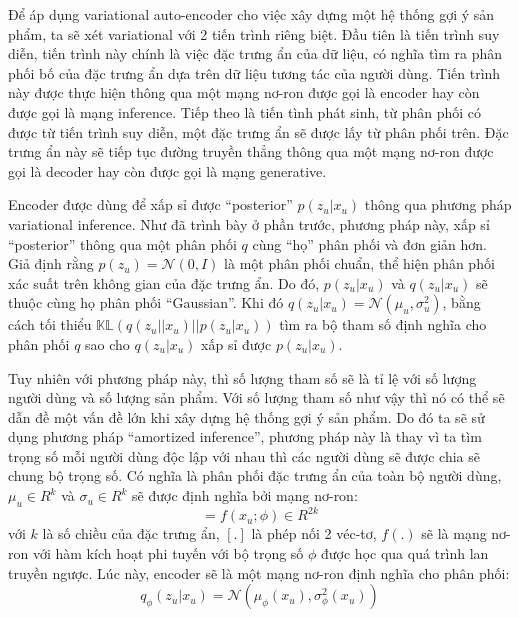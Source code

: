     
    Để áp dụng variational auto-encoder cho việc xây dựng một hệ thống gợi ý sản phẩm, ta sẽ xét variational với 2 tiến trình riêng biệt. 
    Đầu tiên là tiến trình suy diễn, tiến trình này chính là việc đặc trưng ẩn của dữ liệu, có nghĩa tìm ra phân phối bố của đặc trưng ẩn dựa trên dữ liệu tương tác của người dùng. 
    Tiến trình này được thực hiện thông qua một mạng nơ-ron được gọi là encoder hay còn được gọi là mạng inference.
    Tiếp theo là tiến tình phát sinh, từ phân phối có được từ tiến trình suy diễn, một đặc trưng ẩn sẽ được lấy từ phân phối trên. 
    Đặc trưng ẩn này sẽ tiếp tục đường truyền thẳng thông qua một mạng nơ-ron được gọi là decoder hay còn được gọi là mạng generative.



    Encoder được dùng để xấp sỉ được ``posterior'' $p(z_u|x_u)$ thông qua phương pháp variational inference. 
    Như đã trình bày ở phần trước, phương pháp này, xấp sỉ ``posterior'' thông qua một phân phối $q$ cùng ``họ'' phân phối và đơn giản hơn.
    Giả định rằng $p(z_u) = \mathcal{N}(0,I)$ là một phân phối chuẩn, thể hiện phân phối xác suất trên không gian của đặc trưng ẩn.
    Do đó, $p(z_u|x_u)$ và $q(z_u|x_u)$ sẽ thuộc cùng họ phân phối ``Gaussian''. 
    Khi đó $q(z_u|x_u) = \mathcal{N}(\mu_u,\sigma_u^2)$, bằng cách tối thiểu $\mathbb{KL}(q(z_u||x_u) || p(z_u|x_u))$ tìm ra bộ tham số định nghĩa cho phân phối $q$ sao cho $q(z_u | x_u)$ xấp sỉ được $p(z_u|x_u)$.    

    Tuy nhiên với phương pháp này, thì số lượng tham số sẽ là tỉ lệ với số lượng người dùng và số lượng sản phẩm.
    Với số lượng tham số như vậy thì nó có thể sẽ dẫn đề một vấn đề lớn khi xây dựng hệ thống gợi ý sản phẩm.
    Do đó ta sẽ sử dụng phương pháp ``amortized inference'', phương pháp này là thay vì ta tìm trọng số mỗi người dùng độc lập với nhau thì các người dùng sẽ được chia sẽ chung bộ trọng số.
    Có nghĩa là phân phối đặc trưng ẩn của toàn bộ người dùng, $\mu_u \in R^k $ và $\sigma_u \in R^k $ sẽ được định nghĩa bởi mạng nơ-ron:
    \begin{equation}
        [\mu_u,\sigma_u] = f(x_u;\phi) \in R^{2k}
    \end{equation}
    với $k$ là số chiều của đặc trưng ẩn, $[.]$ là phép nối 2 véc-tơ, $f(.)$ sẽ là mạng nơ-ron với hàm kích hoạt phi tuyến với bộ trọng số $\phi$ được học qua quá trình lan truyền ngược.
    Lúc này, encoder sẽ là một mạng nơ-ron định nghĩa cho phân phối:
    \begin{equation}
        \label{inference_net}
        q_\phi(z_u|x_u) = \mathcal{N}(\mu_\phi(x_u),\sigma^2_\phi(x_u))
    \end{equation}
    

